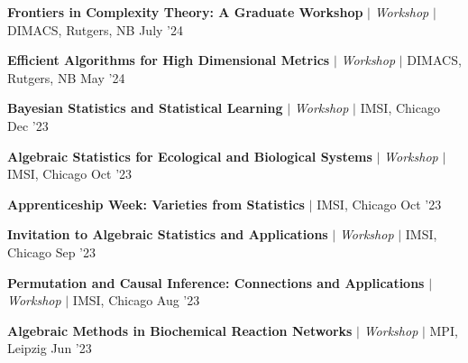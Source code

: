 \resumeProjectHeading
{\textbf{Frontiers in Complexity Theory: A Graduate Workshop} $|$ \textit{\color{gray}Workshop} $|$ DIMACS, Rutgers, NB}
{July '24}
{}
\vspace{\mygap}

\resumeProjectHeading
{\textbf{Efficient Algorithms for High Dimensional Metrics} $|$ \textit{\color{gray}Workshop} $|$ DIMACS, Rutgers, NB}
{May '24}
{}
\vspace{\mygap}

\resumeProjectHeading
{\textbf{Bayesian Statistics and Statistical Learning} $|$ \textit{\color{gray}Workshop} $|$ IMSI, Chicago}
{Dec '23}
{}
\vspace{\mygap}

\resumeProjectHeading
{\textbf{Algebraic Statistics for Ecological and Biological Systems} $|$ \textit{\color{gray}Workshop}  $|$ IMSI, Chicago}
{Oct '23}
{}
\vspace{\mygap}

\resumeProjectHeading
{\textbf{Apprenticeship Week: Varieties from Statistics} $|$ IMSI, Chicago}
{{Oct '23}}
{}
\vspace{\mygap}

\resumeProjectHeading
{\textbf{Invitation to Algebraic Statistics and Applications} $|$ \textit{\color{gray}Workshop}  $|$ IMSI, Chicago}
{{Sep '23}}
{}
\vspace{\mygap}

\resumeProjectHeading
{\textbf{Permutation and Causal Inference: Connections and Applications} $|$ \textit{\color{gray}Workshop} $|$ IMSI, Chicago}
{{Aug '23}}
{}
\vspace{\mygap}

\resumeProjectHeading
{\textbf{Algebraic Methods in Biochemical Reaction Networks} $|$ \textit{\color{gray}Workshop}  $|$ MPI, Leipzig}
{{Jun '23}}
{}


%


